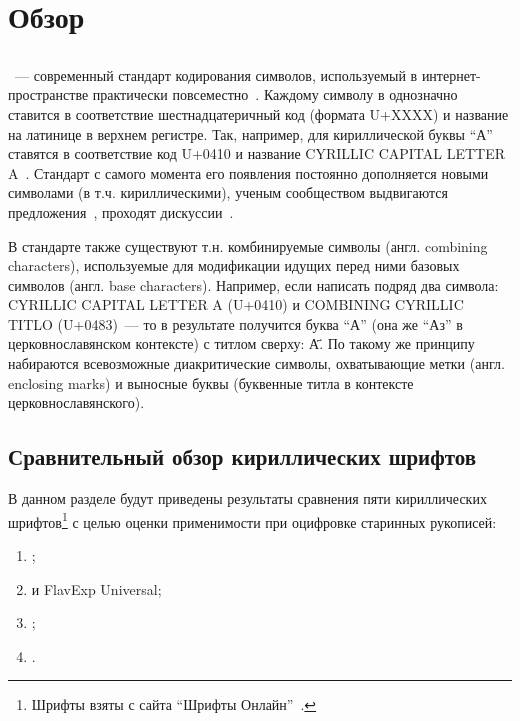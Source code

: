 
\section{Обзор}
\label{sec:relatedworks}

\subsection{\unicode{}}
    \unicode{}~--- современный стандарт кодирования символов, используемый в интернет-пространстве практически повсеместно~\cite{ecnodingChart}. Каждому символу в \unicode{} однозначно ставится в соответствие шестнадцатеричный код (формата U+XXXX) и название на латинице в верхнем регистре. Так, например, для кириллической буквы \enquote{А}  ставятся в соответствие код U+0410 и название CYRILLIC CAPITAL LETTER A~\cite{unicodeStandardCyrillic}. Стандарт с самого момента его появления постоянно дополняется новыми символами (в т.ч. кириллическими), ученым сообществом выдвигаются предложения~\cite{kempgen2006unicode}, проходят дискуссии~\cite{birnbaum2008character}.

    В стандарте также существуют т.н. комбинируемые символы (англ. combining characters), используемые для модификации идущих перед ними базовых символов (англ. base characters). Например, если написать подряд два символа: CYRILLIC CAPITAL LETTER A (U+0410) и COMBINING CYRILLIC TITLO (U+0483)~--- то в результате получится буква \enquote{А} (она же \enquote{Аз} в церковнославянском контексте) с титлом сверху: {\ponomarunicode А҃}. По такому же принципу набираются всевозможные диакритические символы, охватывающие метки (англ. enclosing marks) и выносные буквы (буквенные титла в контексте церковнославянского).

\subsection{Сравнительный обзор кириллических шрифтов}

    В данном разделе будут приведены результаты сравнения пяти кириллических шрифтов\footnote{Шрифты взяты с сайта \enquote{Шрифты Онлайн}~\cite{fontsonline}.} с целью оценки применимости при оцифровке старинных рукописей:
    \begin{enumerate}
        \item \bukyvedefont{};
        \item \flavuniversalfont{} и FlavExp Universal;
        \item \ponomarunicodefont{};
        \item \menaionunicodefont{}.
    \end{enumerate}

